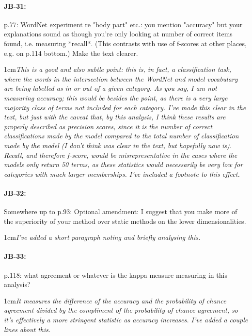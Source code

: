 \documentclass[11pt,a4paper]{article}
\newcommand{\res}[1]{\vspace{0.25cm} \begin{adjustwidth}{1cm}{}\emph{#1}\end{adjustwidth}}
\begin{document}
\paragraph{JB-31:} p.77: WordNet experiment re "body part" etc.: you mention "accuracy" but your explanations sound as though you're only looking at number of correct items found, i.e. measuring *recall*. (This contrasts with use of f-scores at other places, e.g. on p.114 bottom.) Make the text clearer.

\res{This is a good and also subtle point: this is, in fact, a classification task, where the words in the intersection between the WordNet and model vocabulary are being labelled as in or out of a given category.  As you say, I am not measuring accuracy; this would be besides the point, as there is a very large majority class of terms not included for each category.  I've made this clear in the text, but just with the caveat that, by this analysis, I think these results are properly described as precision scores, since it is the number of correct classifications made by the model compared to the total number of classification made by the model (I don't think was clear in the text, but hopefully now is).  Recall, and therefore f-score, would be misrepresentative in the cases where the models only return 50 terms, as these statistics would necessarily be very low for categories with much larger memberships.  I've included a footnote to this effect.}

\paragraph{JB-32:} Somewhere up to p.93: Optional amendment: I suggest that you make more of the superiority of your method over static methods on the lower dimensionalities.

\res{I've added a short paragraph noting and briefly analysing this.}

\paragraph{JB-33:} p.118: what agreement or whatever is the kappa measure measuring in this analysis?

\res{It measures the difference of the accuracy and the probability of chance agreement divided by the compliment of the probability of chance agreement, so it's effectively a more stringent statistic as accuracy increases.  I've added a couple lines about this.}
\end{document}
